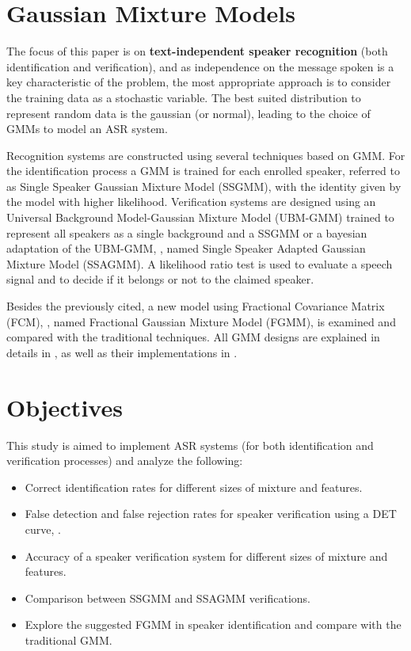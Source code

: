 \section{Gaussian Mixture Models}
\label{sec:gmm}

The focus of this paper is on \textbf{text-independent speaker recognition} (both identification and verification), and as independence on the message spoken is a key characteristic of the problem, the most appropriate approach is to consider the training data as a stochastic variable. The best suited distribution to represent random data is the gaussian (or normal), leading to the choice of GMMs to model an ASR system.

Recognition systems are constructed using several techniques based on GMM. For the identification process a GMM is trained for each enrolled speaker, referred to as Single Speaker Gaussian Mixture Model (SSGMM), with the identity given by the model with higher likelihood. Verification systems are designed using an Universal Background Model-Gaussian Mixture Model (UBM-GMM) trained to represent all speakers as a single background and a SSGMM or a bayesian adaptation of the UBM-GMM, , named Single Speaker Adapted Gaussian Mixture Model (SSAGMM). A likelihood ratio test is used to evaluate a speech signal and to decide if it belongs or not to the claimed speaker.

Besides the previously cited, a new model using Fractional Covariance Matrix (FCM), , named Fractional Gaussian Mixture Model (FGMM), is examined and compared with the traditional techniques. All GMM designs are explained in details in , as well as their implementations in .


\section{Objectives}

This study is aimed to implement ASR systems (for both identification and verification processes) and analyze the following:

\begin{itemize}\itemsep0pt
    \item Correct identification rates for different sizes of mixture and features.
    \item False detection and false rejection rates for speaker verification using a DET curve, .
    \item Accuracy of a speaker verification system for different sizes of mixture and features.
    \item Comparison between SSGMM and SSAGMM verifications.
    \item Explore the suggested FGMM in speaker identification and compare with the traditional GMM.
\end{itemize}


